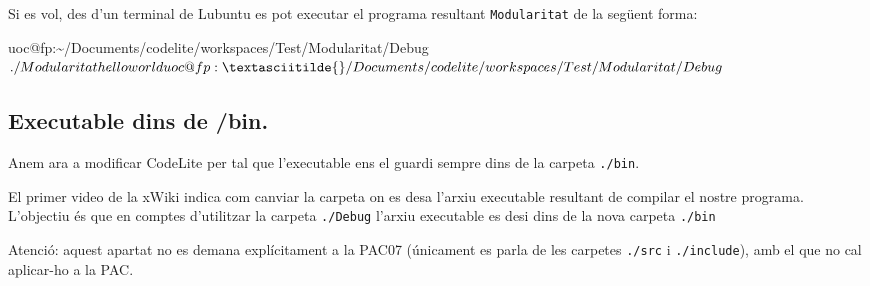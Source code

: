 \documentclass[
]{book}
\newenvironment{Shaded}{\begin{snugshade}}{\end{snugshade}}
\newcommand{\DecValTok}[1]{\textcolor[rgb]{0.00,0.00,0.81}{#1}}
\newcommand{\NormalTok}[1]{#1}
\begin{document}
\begin{Shaded}
\end{Shaded}

Si es vol, des d'un terminal de Lubuntu es pot executar el programa resultant \texttt{Modularitat} de la següent forma:

\begin{Shaded}
\begin{Highlighting}[]
\NormalTok{uoc@fp:\textasciitilde{}/Documents/codelite/workspaces/Test/Modularitat/Debug$ ./Modularitat}
\NormalTok{hello world}
\NormalTok{uoc@fp:\textasciitilde{}/Documents/codelite/workspaces/Test/Modularitat/Debug$}
\end{Highlighting}
\end{Shaded}

\hypertarget{executable-dins-de-bin.}{%
\subsection{Executable dins de /bin.}\label{executable-dins-de-bin.}}

Anem ara a modificar CodeLite per tal que l'executable ens el guardi sempre dins de la carpeta \texttt{./bin}.

El primer video de la xWiki indica com canviar la carpeta on es desa l'arxiu executable resultant de compilar el nostre programa. L'objectiu és que en comptes d'utilitzar la carpeta \texttt{./Debug} l'arxiu executable es desi dins de la nova carpeta \texttt{./bin}

Atenció: aquest apartat no es demana explícitament a la PAC07 (únicament es parla de les carpetes \texttt{./src} i \texttt{./include}), amb el que no cal aplicar-ho a la PAC.
\end{document}
